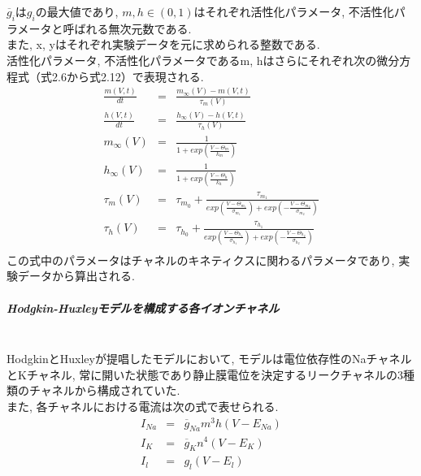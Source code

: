 $\overline{g}_i$は$g_i$の最大値であり, $m, h \in (0, 1)$はそれぞれ活性化パラメータ, 不活性化パラメータと呼ばれる無次元数である.\\
また, x, yはそれぞれ実験データを元に求められる整数である.\\
活性化パラメータ, 不活性化パラメータであるm, hはさらにそれぞれ次の微分方程式（式2.6から式2.12）で表現される.\\
\begin{eqnarray}
  \frac{m(V,t)}{dt} & = &\frac{m_\infty(V) - m(V, t)}{\tau_m(V)}\\
  \frac{h(V,t)}{dt} & = &\frac{h_\infty(V) - h(V, t)}{\tau_h(V)}\\
  m_\infty(V) & = & \frac{1}{1 + exp(\frac{V - \Theta_m}{k_m})}\\
  h_\infty(V) & = & \frac{1}{1 + exp(\frac{V - \Theta_h}{k_h})}\\
  \tau_m(V) & = & \tau_{m_0} + \frac{\tau_{m_1}}{exp(\frac{V - \Theta_{m_1}}{\sigma_{m_1}}) + exp(-\frac{V - \Theta_{m_2}}{\sigma_{m_2}})}\\
  \tau_h(V) & = & \tau_{h_0} + \frac{\tau_{h_1}}{exp(\frac{V - \Theta_{h_1}}{\sigma_{h_1}}) + exp(-\frac{V - \Theta_{h_2}}{\sigma_{h_2}})}\\
\end{eqnarray}
この式中のパラメータはチャネルのキネティクスに関わるパラメータであり, 実験データから算出される.\\

\subparagraph{Hodgkin-Huxleyモデルを構成する各イオンチャネル}~\\
HodgkinとHuxleyが提唱したモデルにおいて, モデルは電位依存性のNaチャネルとKチャネル,
常に開いた状態であり静止膜電位を決定するリークチャネルの3種類のチャネルから構成されていた.\\
また, 各チャネルにおける電流は次の式で表せられる.\\
\begin{eqnarray}
  I_{Na} & = & \overline{g}_{Na}m^3h(V - E_{Na})\\
  I_{K} & = & \overline{g}_{K}n^4(V - E_{K})\\
  I_{l} & =& g_l(V - E_l)\\
\end{eqnarray}

